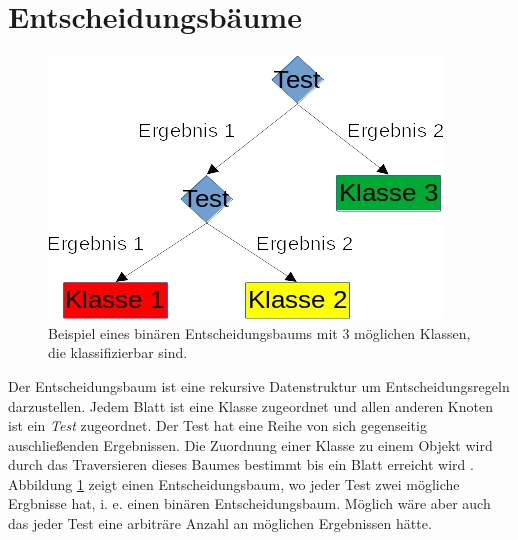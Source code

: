 \section{Entscheidungsbäume}
\begin{figure}
    \centering
    \includegraphics[width=0.5\linewidth]{images/entscheidungsbaum.jpg}
    \caption{Beispiel eines binären Entscheidungsbaums mit 3 möglichen Klassen, die klassifizierbar sind.}
    \label{fig:entscheidungsbaum}
\end{figure}
Der Entscheidungsbaum ist eine rekursive Datenstruktur um Entscheidungsregeln darzustellen. Jedem Blatt ist eine Klasse zugeordnet und allen anderen Knoten ist ein \textit{Test} zugeordnet. Der Test hat eine Reihe von sich
gegenseitig auschließenden Ergebnissen. Die Zuordnung einer Klasse zu einem Objekt wird durch das Traversieren dieses Baumes bestimmt bis ein Blatt erreicht wird \cite{quinlan1990decision}. Abbildung \ref{fig:entscheidungsbaum}
zeigt einen Entscheidungsbaum, wo jeder Test zwei mögliche Ergbnisse hat, i. e. einen binären Entscheidungsbaum. Möglich wäre aber auch das jeder Test eine arbiträre Anzahl an möglichen Ergebnissen hätte.

